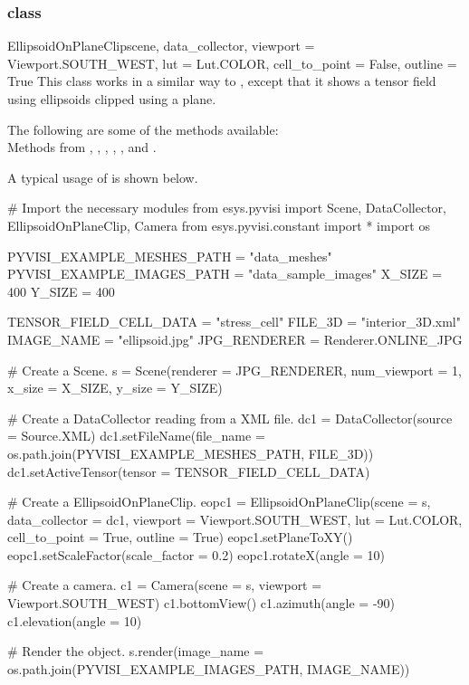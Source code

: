 \subsubsection{\EllipsoidOnPlaneClip class}

\begin{classdesc}{EllipsoidOnPlaneClip}{scene, data_collector,
viewport = Viewport.SOUTH_WEST, lut = Lut.COLOR, cell_to_point = False, 
outline = True}
This class works in a similar way to \MapOnPlaneClip, except that it shows a 
tensor field using ellipsoids clipped using a plane.
\end{classdesc}
        
The following are some of the methods available:\\
Methods from \ActorThreeD, \Sphere, \TensorGlyph, \Transform, \Clipper,
\MaskPoints and \DataSetMapper.

A typical usage of \EllipsoidOnPlaneClip is shown below.

\begin{python}
# Import the necessary modules
from esys.pyvisi import Scene, DataCollector, EllipsoidOnPlaneClip, Camera
from esys.pyvisi.constant import *
import os

PYVISI_EXAMPLE_MESHES_PATH = "data_meshes"
PYVISI_EXAMPLE_IMAGES_PATH = "data_sample_images"
X_SIZE = 400
Y_SIZE = 400

TENSOR_FIELD_CELL_DATA = "stress_cell"
FILE_3D = "interior_3D.xml"
IMAGE_NAME = "ellipsoid.jpg"
JPG_RENDERER = Renderer.ONLINE_JPG

# Create a Scene.
s = Scene(renderer = JPG_RENDERER, num_viewport = 1, x_size = X_SIZE, 
        y_size = Y_SIZE)

# Create a DataCollector reading from a XML file.
dc1 = DataCollector(source = Source.XML)
dc1.setFileName(file_name = os.path.join(PYVISI_EXAMPLE_MESHES_PATH, FILE_3D))
dc1.setActiveTensor(tensor = TENSOR_FIELD_CELL_DATA)

# Create a EllipsoidOnPlaneClip.
eopc1 = EllipsoidOnPlaneClip(scene = s, data_collector = dc1, 
        viewport = Viewport.SOUTH_WEST, lut = Lut.COLOR, cell_to_point = True, 
        outline = True)
eopc1.setPlaneToXY()
eopc1.setScaleFactor(scale_factor = 0.2)
eopc1.rotateX(angle = 10)

# Create a camera.
c1 = Camera(scene = s, viewport = Viewport.SOUTH_WEST)
c1.bottomView()
c1.azimuth(angle = -90)
c1.elevation(angle = 10)

# Render the object.
s.render(image_name = os.path.join(PYVISI_EXAMPLE_IMAGES_PATH, IMAGE_NAME))
\end{python}

